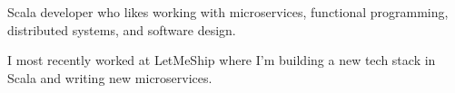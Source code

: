 

\begin{cvparagraph}

Scala developer who likes working with microservices, functional programming, distributed systems, and software design.

I most recently worked at LetMeShip where I'm building a new tech stack in Scala and writing new microservices.

\end{cvparagraph}
